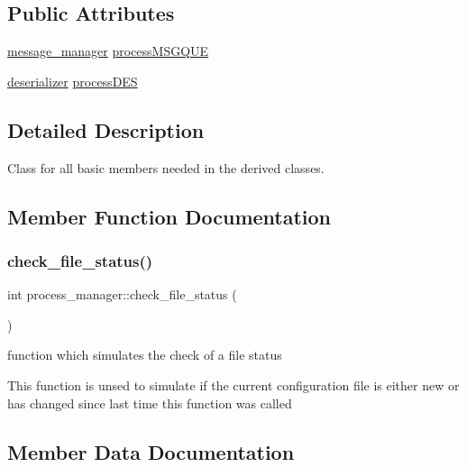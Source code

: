 \subsection*{Public Attributes}
\begin{DoxyCompactItemize}
\item 
\hyperlink{classmessage__manager}{message\+\_\+manager} \hyperlink{classprocess__manager_ab2ca0fdbd1a2975edd1b3f78b5f1f20c}{process\+M\+S\+G\+Q\+UE}
\item 
\hyperlink{classdeserializer}{deserializer} \hyperlink{classprocess__manager_a83b67cdddef3db06c7625f06c9160d53}{process\+D\+ES}
\end{DoxyCompactItemize}


\subsection{Detailed Description}
Class for all basic members needed in the derived classes. 

\subsection{Member Function Documentation}
\mbox{\label{classprocess__manager_a8abc5c342a3ed882973183b77405b667}} 
\subsubsection{\texorpdfstring{check\+\_\+file\+\_\+status()}{check\_file\_status()}}
{\footnotesize\ttfamily int process\+\_\+manager\+::check\+\_\+file\+\_\+status (\begin{DoxyParamCaption}{ }\end{DoxyParamCaption})}



function which simulates the check of a file status 

This function is unsed to simulate if the current configuration file is either new or has changed since last time this function was called 

\subsection{Member Data Documentation}
\mbox{\label{classprocess__manager_a83b67cdddef3db06c7625f06c9160d53}} 
